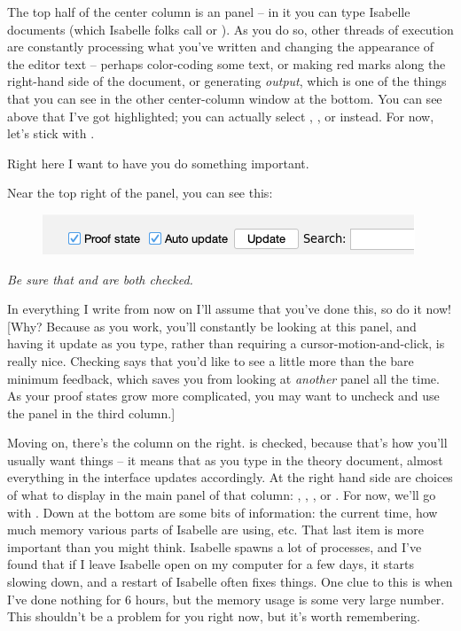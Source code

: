 The top half of the center column is an  panel -- in it you can type Isabelle documents (which Isabelle folks call  or ). As you do so, other threads of execution are constantly processing what you've written and changing the appearance of the editor text -- perhaps color-coding some text, or making red marks along the right-hand side of the document, or generating \textit{output}, which is one of the things that you can see in the other center-column window at the bottom. You can see above that I've got  highlighted; you can actually select , , or  instead. For now, let's stick with . 

Right here I want to have you do something important. 

\task
Near the top right of the 
 panel, you can see this:
\begin{figure}[h]
    \centering
    \includegraphics[width=0.75\linewidth]{TEXT/C01//Images/image.png}
\end{figure}
\textit{Be sure that  and  are both checked.} 
\etask

In everything I write from now on I'll assume that you've done this, so do it now! [Why? Because as you work, you'll constantly be looking at this panel, and having it update as you type, rather than requiring a cursor-motion-and-click, is really nice. Checking  says that you'd like to see a little more than the bare minimum feedback, which saves you from looking at \textit{another} panel all the time. As your proof states grow more complicated, you may want to uncheck  and use the  panel in the third column.]

Moving on, there's the column on the right.  is checked, because that's how you'll usually want things -- it means that as you type in the theory document, almost everything in the interface updates accordingly. At the right hand side are choices of what to display in the main panel of that column: , , , or . For now, we'll go with . Down at the bottom are some bits of information: the current time, how much memory various parts of Isabelle are using, etc. That last item is more important than you might think. Isabelle spawns a lot of processes, and I've found that if I leave Isabelle open on my computer for a few days, it starts slowing down, and a restart of Isabelle often fixes things. One clue to this is when I've done nothing for 6 hours, but the memory usage is some very large number. This shouldn't be a problem for you right now, but it's worth remembering.  

